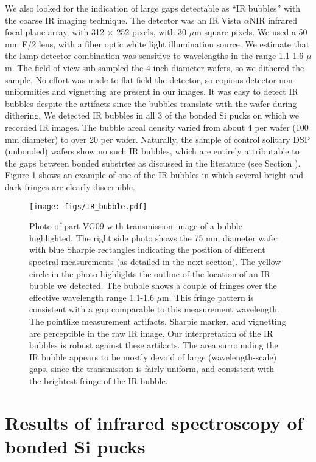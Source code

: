 \documentclass[osajnl,preprint,showpacs,superscriptaddress,12pt]{revtex4-1} %
\begin{document}
We also looked for the indication of large gaps detectable as ``IR bubbles'' \cite{1992JEMat..21..669M} with the coarse IR imaging technique.  The detector was an IR Vista $\alpha$NIR infrared focal plane array, with 312 $\times$ 252 pixels, with 30 $\mu$m square pixels.  We used a 50 mm F/2 lens, with a fiber optic white light illumination source.  We estimate that the lamp-detector combination was sensitive to wavelengths in the range 1.1-1.6 $\mu$m.  The field of view sub-sampled the 4 inch diameter wafers, so we dithered the sample.  No effort was made to flat field the detector, so copious detector non-uniformities and vignetting are present in our images.  It was easy to detect IR bubbles despite the artifacts since the bubbles translate with the wafer during dithering.  We detected IR bubbles in all 3 of the bonded Si pucks on which we recorded IR images.  The bubble areal density varied from about 4 per wafer (100 mm diameter) to over 20 per wafer.  Naturally, the sample of control solitary DSP (unbonded) wafers show no such IR bubbles, which are entirely attributable to the gaps between bonded substrtes as discussed in the literature (see Section \label{secHistory}).  Figure \ref{IRbubble} shows an example of one of the IR bubbles in which several bright and dark fringes are clearly discernible.

\begin{figure}[htbp]
\centerline{\texttt{[image: figs/IR\_bubble.pdf]}}
\caption{Photo of part VG09 with transmission image of a bubble highlighted\label{IRbubble}.  The right side photo shows the 75 mm diameter wafer with blue Sharpie rectangles indicating the position of different spectral measurements (as detailed in the next section).  The yellow circle in the photo highlights the outline of the location of an IR bubble we detected.  The bubble shows a couple of fringes over the effective wavelength range 1.1-1.6 $\mu$m.  This fringe pattern is consistent with a gap comparable to this measurement wavelength.  The pointlike measurement artifacts, Sharpie marker, and vignetting are perceptible in the raw IR image.  Our interpretation of the IR bubbles is robust against these artifacts.  The area surrounding the IR bubble appears to be mostly devoid of large (wavelength-scale) gaps, since the transmission is fairly uniform, and consistent with the brightest fringe of the IR bubble.  }
\end{figure}


\section{Results of infrared spectroscopy of bonded Si pucks}
\end{document}
